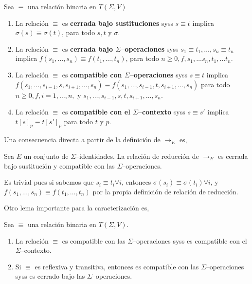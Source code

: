 \begin{defi} 
  Sea $\equiv$ una relación binaria en $T(\Sigma,V)$
  \begin{enumerate}
  \item La relación $\equiv$ es \textbf{cerrada bajo sustituciones} syss $s \equiv t$
    implica $\sigma(s) \equiv \sigma(t)$, para todo $s,t$ y $\sigma$. 
  \item La relación $\equiv$ es \textbf{cerrada bajo $\Sigma$--operaciones} syss $s_1
    \equiv t_1, \dots, s_n \equiv t_n$ implica $f(s_1, \dots, s_n) \equiv
    f(t_1, \dots, t_n)$, para todo $n \geq 0, f, s_1, \dots s_n, t_1, \dots
    t_n.$ 
  \item La relación $\equiv$ es \textbf{compatible con $\Sigma$--operaciones} syss $ s
    \equiv t$ implica $f(s_1, \dots, s_{i-1},s, s_{i+1},\dots, s_n) \equiv
    f(s_1, \dots, s_{i-1},t, s_{i+1},\dots, s_n)$ para todo $n \geq 0, f, i =
    1, \dots, n,$ y $s_1, \dots, s_{i-1},s,t, s_{i+1},\dots, s_n$. 
  \item La relación $\equiv$ es \textbf{compatible con el $\Sigma$--contexto} syss $s
    \equiv s'$ implica $t[s]_p \equiv t[s']_p$ para todo $t$ y $p$. 
  \end{enumerate}       
\end{defi}

Una consecuencia directa a partir de la definición de $\rightarrow_E$ es,

\begin{lema} \label{lema:2.1}
  Sea $E$ un conjunto de $\Sigma$--identidades. La relación de reducción de
  $\rightarrow_E$ es cerrada bajo sustitución y compatible con las
  $\Sigma$--operaciones.
\end{lema}

\begin{demo}
  Es trivial pues si sabemos que $s_i \equiv t_i \forall i$, entonces
  $\sigma(s_i) \equiv \sigma(t_i) \forall i$, y
  $f(s_1, \dots, s_n) \equiv f(t_1, \dots, t_n)$ por la propia
  definición de relación de reducción.
\end{demo}

Otro lema importante para la caracterización es,

\begin{lema} \label{lema:2.2}
  Sea $\equiv$ una relación binaria en $T(\Sigma,V)$.
  \begin{enumerate}
  \item La relación $\equiv$ es compatible con las
    $\Sigma$--operaciones syss es compatible con el
    $\Sigma$--contexto.
  \item Si $\equiv$ es reflexiva y transitiva, entonces es compatible
    con las $\Sigma$--operaciones syss es cerrado bajo las
    $\Sigma$--operaciones.
  \end{enumerate}
\end{lema}

